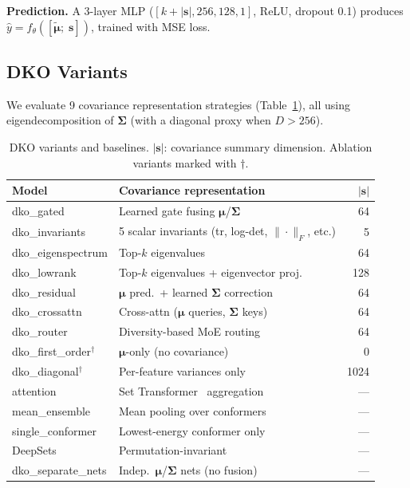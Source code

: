 \documentclass[sigconf]{acmart}
\begin{document}
\textbf{Prediction.} A 3-layer MLP ($[k{+}|\mathbf{s}|, 256, 128, 1]$, ReLU, dropout 0.1) produces $\hat{y} = f_\theta([\tilde{\boldsymbol{\mu}};\; \mathbf{s}])$, trained with MSE loss.

\subsection{DKO Variants}
\label{sec:variants}

We evaluate 9 covariance representation strategies (Table~\ref{tab:variants}), all using eigendecomposition of $\boldsymbol{\Sigma}$ (with a diagonal proxy when $D > 256$).

\begin{table}[t]
\caption{DKO variants and baselines. $|\mathbf{s}|$: covariance summary dimension. Ablation variants marked with $\dagger$.}
\label{tab:variants}
\centering
\scriptsize
\begin{tabular}{@{}llr@{}}
\toprule
Model & Covariance representation & $|\mathbf{s}|$ \\
\midrule
dko\_gated & Learned gate fusing $\boldsymbol{\mu}$/$\boldsymbol{\Sigma}$ & 64 \\
dko\_invariants & 5 scalar invariants (tr, log-det, $\|\cdot\|_F$, etc.) & 5 \\
dko\_eigenspectrum & Top-$k$ eigenvalues & 64 \\
dko\_lowrank & Top-$k$ eigenvalues + eigenvector proj. & 128 \\
dko\_residual & $\boldsymbol{\mu}$ pred.\ + learned $\boldsymbol{\Sigma}$ correction & 64 \\
dko\_crossattn & Cross-attn ($\boldsymbol{\mu}$ queries, $\boldsymbol{\Sigma}$ keys) & 64 \\
dko\_router & Diversity-based MoE routing & 64 \\
dko\_first\_order$^\dagger$ & $\boldsymbol{\mu}$-only (no covariance) & 0 \\
dko\_diagonal$^\dagger$ & Per-feature variances only & 1024 \\
\midrule
attention & Set Transformer~\cite{lee2019set} aggregation & --- \\
mean\_ensemble & Mean pooling over conformers & --- \\
single\_conformer & Lowest-energy conformer only & --- \\
DeepSets & Permutation-invariant~\cite{zaheer2017deepsets} & --- \\
dko\_separate\_nets & Indep.\ $\boldsymbol{\mu}$/$\boldsymbol{\Sigma}$ nets (no fusion) & --- \\
\bottomrule
\end{tabular}
\end{table}
\end{document}
